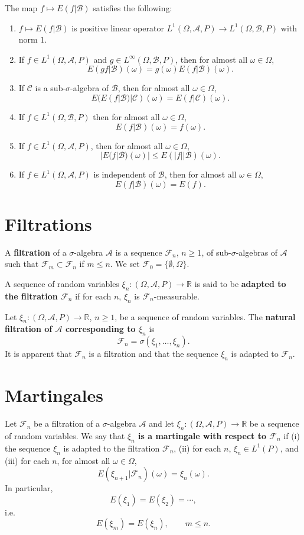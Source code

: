 \documentclass{article}
\theoremstyle{definition}
\begin{document}
The map $f \mapsto E(f|\mathscr{B})$ satisfies the following:
\begin{enumerate}
\item $f \mapsto E(f|\mathscr{B})$ is positive linear operator $L^1(\Omega,\mathscr{A},P)
\to L^1(\Omega,\mathscr{B},P)$ with norm $1$.
\item If $f \in L^1(\Omega,\mathscr{A},P)$ and $g \in L^\infty(\Omega,\mathscr{B},P)$, then for almost all
$\omega \in \Omega$,
\[
E(gf|\mathscr{B})(\omega) = g(\omega) E(f|\mathscr{B})(\omega).
\]
\item If $\mathscr{C}$ is a sub-$\sigma$-algebra of $\mathscr{B}$, then
for almost all $\omega \in \Omega$,
\[
E(E(f|\mathscr{B})|\mathscr{C})(\omega) = E(f|\mathscr{C})(\omega).
\]
\item If $f \in L^1(\Omega,\mathscr{B},P)$ then for almost all $\omega \in \Omega$,
\[
E(f|\mathscr{B})(\omega) = f(\omega).
\]
\item If $f \in L^1(\Omega,\mathscr{A},P)$, then
for almost all $\omega \in \Omega$,
\[
|E(f|\mathscr{B})(\omega)| \leq E(|f| |\mathscr{B})(\omega).
\]
\item If $f \in L^1(\Omega,\mathscr{A},P)$ is independent of $\mathscr{B}$, then for almost all $\omega \in \Omega$,
\[
E(f|\mathscr{B})(\omega) = E(f).
\]
\end{enumerate}




\section{Filtrations}
A \textbf{filtration} of a $\sigma$-algebra $\mathscr{A}$ is a sequence
$\mathscr{F}_n$, $n \geq 1$, of sub-$\sigma$-algebras of $\mathscr{A}$ such that
$\mathscr{F}_m \subset \mathscr{F}_n$ if $m \leq n$. 
We set $\mathscr{F}_0=\{\emptyset,\Omega\}$. 

A sequence of random variables $\xi_n:(\Omega,\mathscr{A},P) \to \mathbb{R}$ is said to be \textbf{adapted to the filtration $\mathscr{F}_n$}
if for each $n$, $\xi_n$ is $\mathscr{F}_n$-measurable.

Let $\xi_n:(\Omega,\mathscr{A},P) \to \mathbb{R}$, $n \geq 1$, be a sequence of random variables. The
\textbf{natural filtration of $\mathscr{A}$ corresponding to $\xi_n$} is
\[
\mathscr{F}_n =\sigma(\xi_1,\ldots,\xi_n).
\]
It is apparent that $\mathscr{F}_n$ is a filtration and that the sequence $\xi_n$ is adapted to $\mathscr{F}_n$. 


\section{Martingales}
Let $\mathscr{F}_n$ be a filtration of a $\sigma$-algebra $\mathscr{A}$ and let
$\xi_n:(\Omega,\mathscr{A},P) \to \mathbb{R}$ be a sequence of random variables.
We say that \textbf{$\xi_n$ is a martingale with respect to $\mathscr{F}_n$} if
(i) the sequence $\xi_n$ is adapted to the filtration $\mathscr{F}_n$, 
(ii) for each $n$, $\xi_n \in L^1(P)$, and (iii) for each $n$, for almost all $\omega \in \Omega$,
\[
E(\xi_{n+1}|\mathscr{F}_n)(\omega) = \xi_n(\omega).
\]
In particular, 
\[
E(\xi_1)=E(\xi_2)=\cdots,
\]
i.e.
\[
E(\xi_m) = E(\xi_n), \qquad m \leq n.
\]
\end{document}
